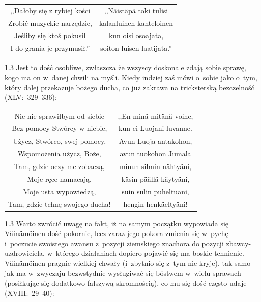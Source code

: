 \documentclass[11pt,a4paper,twoside]{report}
\begin{document}
\newpage
{\centering
\small
\begin{longtable}{c c}
,,Dałoby się z rybiej kości  & ,,Näistäpä toki tulisi \\
Zrobić muzyckie narzędzie,   & kalanluinen kanteloinen \\
Jeśliby się ktoś pokusił     & kun oisi osoajata, \\
I do grania je przymusił.''  & soiton luisen laatijata.'' \\
\end{longtable}
}

\begin{spacing}{1.3}
Jest to dość osobliwe, zwłaszcza że wszyscy doskonale zdają sobie sprawę, kogo ma on w~danej chwili na myśli. Kiedy indziej zaś mówi o~sobie jako o~tym, który dalej przekazuje bożego ducha, co już zakrawa na tricksterską bezczelność (XLV:~329--336):
\end{spacing}
{\centering
\small
\begin{longtable}{c c}
Nic nie sprawiłbym od siebie  & ,,En minä mitänä voine, \\
Bez pomocy Stwórcy w niebie,  & kun ei Luojani luvanne. \\
Użycz, Stwórco, swej pomocy,  & Avun Luoja antakohon, \\
Wspomożenia użycz, Boże,      & avun tuokohon Jumala \\
Tam, gdzie oczy me zobaczą,   & minun silmin nähtyäni, \\
Moje ręce namacają,           & käsin päällä käytyäni, \\
Moje usta wypowiedzą,         & suin sulin puheltuani, \\
Tam, gdzie tchnę swojego ducha! & hengin henkäeltyäni! \\
\end{longtable}
}
\begin{spacing}{1.3}
Warto zwrócić uwagę na fakt, iż na samym początku wypowiada się Väinämöinen dość pokornie, lecz zaraz jego pokora zmienia się w~pychę i~poczucie swoistego awansu z~pozycji ziemskiego znachora do pozycji zbawcy-uzdrowiciela, w~którego działaniach dopiero pojawić się ma boskie tchnienie. Väinämöinen pragnie wielkiej chwały (i~zbytnio się z~tym nie kryje), tak samo jak ma w~zwyczaju bezwstydnie wysługiwać się bóstwem w~wielu sprawach (posiłkując się dodatkowo fałszywą skromnością), co mu się dość często udaje (XVIII:~29--40):
\end{spacing}
\end{document}
